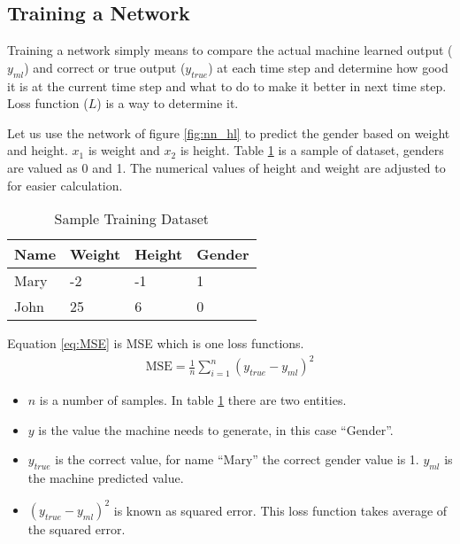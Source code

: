 \subsection*{Training a Network}

Training a network simply means to compare the actual machine learned output ($ y_{ml} $) and correct or true output ($ y_ {true} $) at each time step and determine how good it is at the current time step and what to do to make it better in next time step. Loss function ($ L $) is a way to determine it. 

Let us use the network of figure \ref{fig:nn_hl} to predict the gender based on weight and height. $x_1$ is weight and $x_2$ is height. Table \ref{table:Sample Training Dataset} is a sample of dataset, genders are valued as 0 and 1. The numerical values of height and weight are adjusted to for easier calculation. 

\begin{table}[h]
    \centering
    \caption{Sample Training Dataset}
    \label{table:Sample Training Dataset}
    \begin{tabular}{ llll }
          \toprule
          
          \textbf{Name}& \textbf{Weight} & \textbf{Height}  & \textbf{Gender}\\
          \midrule
          Mary&-2 & -1 & 1\\
          John&25 & 6 & 0\\         
         
          \bottomrule
          \end{tabular}
\end{table}


Equation \ref{eq:MSE} is \acf{MSE} which is one loss functions. 
\begin{align}
    \text{MSE} = \frac{1}{n} \sum_{i=1}^{n} (y_ {true} - y_{ml})^2 \label{eq:MSE}
\end{align}


\begin{itemize}
    \item $n$ is a number of samples. In table \ref{table:Sample Training Dataset} there are two entities.
    \item $y$ is the value the machine needs to generate, in this case ``Gender''.
    \item $y_ {true}$ is the correct value, for name ``Mary'' the correct gender value is 1. $y_ {ml}$ is the machine  predicted value.
    \item $(y_ {true} - y_{ml})^2$ is known as squared error. This loss function takes average of the squared error.
\end{itemize}



